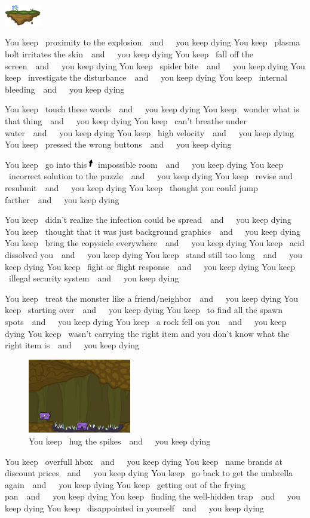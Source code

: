 \documentclass[twocolumn]{article}
\newcommand\ykd[1]{You keep ~{#1}~~and~~~you keep dying\qquad}
\begin{document}
\vspace{0.55in}
\qquad\qquad\qquad\includegraphics[width=0.12\textwidth]{platform}

\ykd{proximity to the explosion}
\ykd{plasma bolt irritates the skin}
\ykd{fall off the screen}
\ykd{spider bite}
\ykd{investigate the disturbance}
\ykd{internal bleeding}

\vspace{0.8in}
\ykd{touch these words}
\ykd{wonder what is that thing}
\ykd{can't breathe under water}
\ykd{high velocity}
\ykd{pressed the wrong buttons}

\vspace{0.7in}
\ykd{go into this\includegraphics[width=1em]{uparrow} impossible room}
\ykd{incorrect solution to the puzzle}
\ykd{revise and resubmit}
\ykd{thought you could jump farther}

\ykd{didn't realize the infection could be spread}
\ykd{thought that it was just background graphics}
\ykd{bring the copysicle everywhere}
\ykd{acid dissolved you}
\ykd{stand still too long}
\ykd{fight or flight response}
\ykd{illegal security system}

\vspace{0.5in}
\ykd{treat the monster like a friend/neighbor}
\ykd{starting over}
\ykd{to find all the spawn spots}
\ykd{a rock fell on you}
\ykd{wasn't carrying the right item and you don't know what the right item is}

\begin{figure}[t!]
\begin{center}
\includegraphics[width=0.40\textwidth]{spikes}
\end{center}
\caption{\tiny \ykd{hug the spikes}} \label{fig:spikes}
\end{figure}

\ykd{overfull hbox}
\ykd{name brands at discount prices}
\ykd{go back to get the umbrella again}
\ykd{getting out of the frying pan}
\ykd{finding the well-hidden trap}
\ykd{disappointed in yourself}
\end{document}
